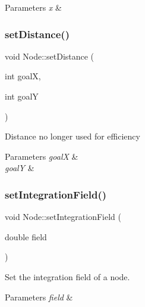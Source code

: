 \begin{DoxyParams}{Parameters}
{\em x} & \\
\hline
\end{DoxyParams}
\mbox{\label{class_node_a2066fcdaacfab4e47e976a9a4f60f011}} 
\subsubsection{\texorpdfstring{setDistance()}{setDistance()}}
{\footnotesize\ttfamily void Node\+::set\+Distance (\begin{DoxyParamCaption}\item[{int}]{goalX,  }\item[{int}]{goalY }\end{DoxyParamCaption})}



Distance no longer used for efficiency 


\begin{DoxyParams}{Parameters}
{\em goalX} & \\
\hline
{\em goalY} & \\
\hline
\end{DoxyParams}
\mbox{\label{class_node_ae93169d2d1e75142b35699b22804ab82}} 
\subsubsection{\texorpdfstring{setIntegrationField()}{setIntegrationField()}}
{\footnotesize\ttfamily void Node\+::set\+Integration\+Field (\begin{DoxyParamCaption}\item[{double}]{field }\end{DoxyParamCaption})}



Set the integration field of a node. 


\begin{DoxyParams}{Parameters}
{\em field} & \\
\hline
\end{DoxyParams}
\mbox{\label{class_node_af93f2231cdb17bec0ff4d77972aefc82}} 
